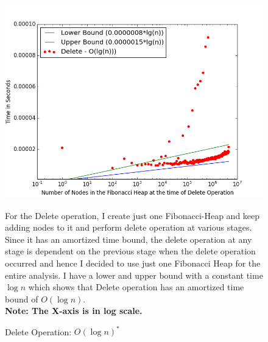 \begin{figure}
\includegraphics[width=0.95\columnwidth]{Figures/fibonacciHeapPerformanceDelete}
\caption{Delete Operation: $O(\log{n})^{*}$}
\label{performanceDelete}
For the Delete operation, I create just one Fibonacci-Heap and keep adding nodes to it and perform delete operation at various stages. Since it has an amortized time bound, the delete operation at any stage is dependent on the previous stage when the delete operation occurred and hence I decided to use just one Fibonacci Heap for the entire analysis. I have a lower and upper bound with a constant time $\log{n}$ which shows that Delete operation has an amortized time bound of $O(\log{n})$.\\ \textbf{Note: The X-axis is in log scale.}
\end{figure}

